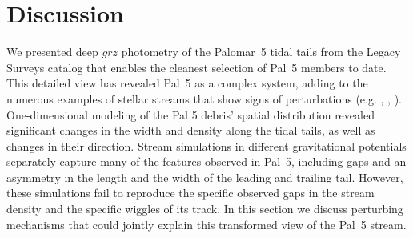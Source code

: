 \documentclass[twocolumn]{aastex62}
\newcommand{\sa}[1]{{\color{magenta} SP: #1}}
\begin{document}
%


\section{Discussion}
\label{sec:discussion}
We presented deep $grz$ photometry of the Palomar~5 tidal tails from the Legacy Surveys catalog that enables the cleanest selection of Pal~5 members to date. This detailed view has revealed Pal~5 as a complex system, adding to the numerous examples of stellar streams that show signs of perturbations (e.g. \citealt{Sesar:2016}, \citealt{Price-Whelan:2018}, \citealt{Bonaca:2019a}).
One-dimensional modeling of the Pal 5 debris' spatial distribution revealed significant changes in the width and density along the tidal tails, as well as changes in their direction.
Stream simulations in different gravitational potentials separately capture many of the features observed in Pal~5, including gaps and an asymmetry in the length and the width of the leading and trailing tail.
However, these simulations fail to reproduce the specific observed gaps in the stream density and the specific wiggles of its track.
In this section we discuss perturbing mechanisms that could jointly explain this transformed view of the Pal~5 stream.
\end{document}
